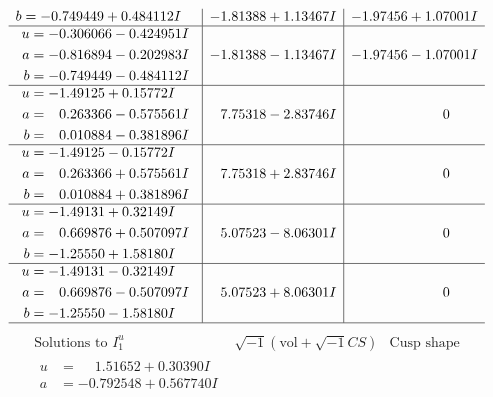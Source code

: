 \documentclass[1p]{elsarticle_modified}
\theoremstyle{definition}
\newcommand{\I}{\sqrt{-1}}
\begin{document}
$$\begin{array}{c|c|c}
\begin{aligned}
b &= -0.749449 + 0.484112 I\end{aligned}
 & -1.81388 + 1.13467 I & -1.97456 + 1.07001 I \\ \hline\begin{aligned}
u &= -0.306066 - 0.424951 I \\
a &= -0.816894 - 0.202983 I \\
b &= -0.749449 - 0.484112 I\end{aligned}
 & -1.81388 - 1.13467 I & -1.97456 - 1.07001 I \\ \hline\begin{aligned}
u &= -1.49125 + 0.15772 I \\
a &= \phantom{-}0.263366 - 0.575561 I \\
b &= \phantom{-}0.010884 - 0.381896 I\end{aligned}
 & \phantom{-}7.75318 - 2.83746 I & \phantom{-0.000000 } 0 \\ \hline\begin{aligned}
u &= -1.49125 - 0.15772 I \\
a &= \phantom{-}0.263366 + 0.575561 I \\
b &= \phantom{-}0.010884 + 0.381896 I\end{aligned}
 & \phantom{-}7.75318 + 2.83746 I & \phantom{-0.000000 } 0 \\ \hline\begin{aligned}
u &= -1.49131 + 0.32149 I \\
a &= \phantom{-}0.669876 + 0.507097 I \\
b &= -1.25550 + 1.58180 I\end{aligned}
 & \phantom{-}5.07523 - 8.06301 I & \phantom{-0.000000 } 0 \\ \hline\begin{aligned}
u &= -1.49131 - 0.32149 I \\
a &= \phantom{-}0.669876 - 0.507097 I \\
b &= -1.25550 - 1.58180 I\end{aligned}
 & \phantom{-}5.07523 + 8.06301 I & \phantom{-0.000000 } 0\\
 \hline 
 \end{array}$$\newpage$$\begin{array}{c|c|c}  
\text{Solutions to }I^u_{1}& \I (\text{vol} + \sqrt{-1}CS) & \text{Cusp shape}\\
 \hline 
\begin{aligned}
u &= \phantom{-}1.51652 + 0.30390 I \\
a &= -0.792548 + 0.567740 I \\

\end{aligned}
\end{array}$$
\end{document}
